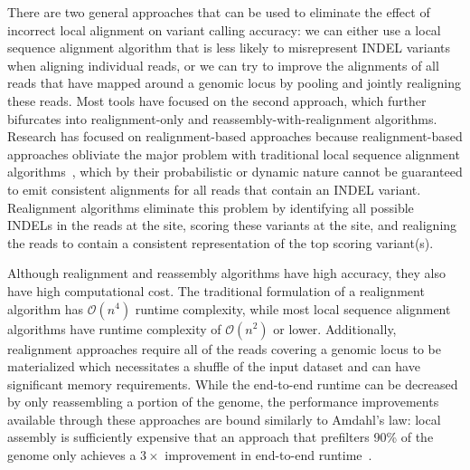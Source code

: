 \documentclass{bioinfo}
\begin{document}
There are two general approaches that can be used to eliminate the effect of
incorrect local alignment on variant calling accuracy: we can either use a local
sequence alignment algorithm that is less likely to misrepresent INDEL variants
when aligning individual reads, or we can try to improve the alignments of all
reads that have mapped around a genomic locus by pooling and jointly realigning
these reads. Most tools have focused on the second approach, which further
bifurcates into realignment-only and reassembly-with-realignment algorithms.
Research has focused on realignment-based approaches because realignment-based
approaches obliviate the major problem with traditional local sequence alignment
algorithms~\citep{smith81, ukkonen85, landau86}, which by their probabilistic or
dynamic nature cannot be guaranteed to emit consistent alignments for all reads
that contain an INDEL variant. Realignment algorithms eliminate
this problem by identifying all possible INDELs in the reads at the site,
scoring these variants at the site, and realigning the reads to contain a
consistent representation of the top scoring variant(s).

Although realignment and reassembly algorithms have high accuracy, they also
have high computational cost. The traditional formulation of a realignment
algorithm has $\mathcal{O}(n^4)$ runtime complexity, while most local sequence
alignment algorithms have runtime complexity of $\mathcal{O}(n^2)$ or lower.
Additionally, realignment approaches require all of the reads covering a
genomic locus to be materialized which necessitates a shuffle of the input
dataset and can have significant memory requirements. While the end-to-end
runtime can be decreased by only reassembling a portion of the genome, the
performance improvements available through these approaches are bound similarly
to Amdahl's law: local assembly is sufficiently expensive that an approach that
prefilters 90\% of the genome only achieves a $3\times$ improvement in
end-to-end runtime~\citep{bloniarz14}.
\end{document}
